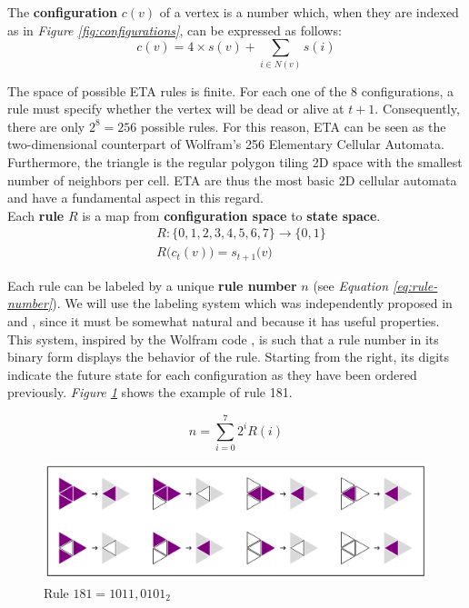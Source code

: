 \documentclass{article}
\begin{document}
The \textbf{configuration} $c(v)$ of a vertex is a number which, when they are indexed as in \linebreak \textit{Figure \ref{fig:configurations}}, can be expressed as follows:
\begin{equation}
c(v)=4\times s(v)+\sum_{i\in N(v)} s(i)
\end{equation}

The space of possible ETA rules is finite. For each one of the 8 configurations, a rule must specify whether the vertex will be dead or alive at $t+1$. Consequently, there are only $2^8=256$ possible rules. For this reason, ETA can be seen as the two-dimensional counterpart of Wolfram’s 256 Elementary Cellular Automata\cite{wolfram2002new, weisstein2002elementary}. Furthermore, the triangle is the regular polygon tiling 2D space with the smallest number of neighbors per cell. ETA are thus the most basic 2D cellular automata and have a fundamental aspect in this regard. \\

\noindent Each \textbf{rule} $R$ is a map from \textbf{configuration space} to \textbf{state space}.
\begin{equation}
\begin{aligned}
& R: \{0,1,2,3,4,5,6,7\}\rightarrow\{0,1\}\\  
& R\big(c_t(v)\big)=s_{t+1}\big(v\big)
\end{aligned}
\end{equation}

Each rule can be labeled by a unique \textbf{rule number} $n$ (see \textit{Equation \ref{eq:rule-number}}). We will use the labeling system which was independently proposed in \cite{zawidzkiApplicationSemitotalistic2D2011} and \cite{cousin2022organic}, since it must be somewhat natural and because it has useful properties. This system, inspired by the Wolfram code \cite{wolfram2002new}, is such that a rule number in its binary form displays the behavior of the rule. Starting from the right, its digits indicate the future state for each configuration as they have been ordered previously. \textit{Figure \ref{fig:rule-plot-181}} shows the example of rule 181.

\begin{equation} \label{eq:rule-number}
    n=\sum_{i=0}^7 2^i R(i)
\end{equation}

\begin{figure}[H]
    \centering
    \includegraphics[width=.8\textwidth]{graphics/introduction/rule-plot-181.pdf}
    \caption{Rule $181=1011,0101_2$}
    \label{fig:rule-plot-181}
\end{figure}
\end{document}
